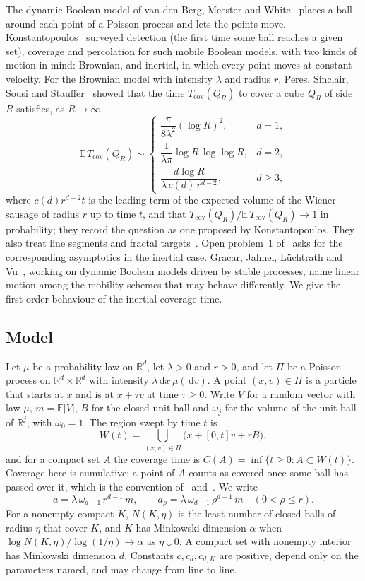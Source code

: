 \documentclass[11pt,a4paper]{article}
\numberwithin{equation}{section}
\theoremstyle{definition}
\theoremstyle{remark}
\newcommand{\E}{\mathbb E}
\newcommand{\R}{\mathbb R}
\newcommand{\dd}{\,\mathrm d}
\newcommand{\abs}[1]{\lvert#1\rvert}
\begin{document}
The dynamic Boolean model of van den Berg, Meester and White~\cite{BMW97}
places a ball around each point of a Poisson process and lets the points move.
Konstantopoulos~\cite{Kon14} surveyed detection (the first time some ball
reaches a given set), coverage and percolation for such mobile Boolean models,
with two kinds of motion in mind: Brownian, and inertial, in which every point
moves at constant velocity. For the Brownian model with intensity $\lambda$
and radius $r$, Peres, Sinclair, Sousi and Stauffer~\cite[Theorem~1.4]{PSSS13}
showed that the time $T_{\mathrm{cov}}(Q_R)$ to cover a cube $Q_R$ of side $R$
satisfies, as $R\to\infty$,
\[
\E\,T_{\mathrm{cov}}(Q_R)\sim
\begin{cases}
\dfrac{\pi}{8\lambda^2}(\log R)^2, & d=1,\\[1.2ex]
\dfrac{1}{\lambda\pi}\log R\,\log\log R, & d=2,\\[1.2ex]
\dfrac{d\log R}{\lambda\,c(d)\,r^{d-2}}, & d\ge3,
\end{cases}
\]
where $c(d)r^{d-2}t$ is the leading term of the expected volume of the Wiener
sausage of radius $r$ up to time $t$, and that
$T_{\mathrm{cov}}(Q_R)/\E\,T_{\mathrm{cov}}(Q_R)\to1$ in probability; they
record the question as one proposed by Konstantopoulos. They also treat line
segments and fractal targets~\cite[Theorem~4.2]{PSSS13}. Open problem~1
of~\cite{Kon14} asks for the
corresponding asymptotics in the inertial case. Gracar, Jahnel, L\"uchtrath and
Vu~\cite{GJLV26}, working on dynamic Boolean models driven by stable
processes, name linear motion among the
mobility schemes that may behave differently. We give the first-order
behaviour of the inertial coverage time.

\subsection{Model}
Let $\mu$ be a probability law on $\R^d$, let $\lambda>0$ and $r>0$, and let
$\Pi$ be a Poisson process on $\R^d\times\R^d$ with intensity
$\lambda\dd x\,\mu(\dd v)$. A point $(x,v)\in\Pi$ is a particle that starts at
$x$ and is at $x+\tau v$ at time $\tau\ge0$. Write $V$ for a random vector with law
$\mu$, $m=\E\abs{V}$, $B$ for the closed unit ball and $\omega_j$ for the
volume of the unit ball of $\R^j$, with $\omega_0=1$. The region swept by
time $t$ is
\[
W(t)=\bigcup_{(x,v)\in\Pi}\bigl(x+[0,t]v+rB\bigr),
\]
and for a compact set $A$ the coverage time is
$C(A)=\inf\{t\ge0:A\subset W(t)\}$. Coverage here is cumulative: a point of
$A$ counts as covered once some ball has passed over it, which is the
convention of~\cite{Kon14} and~\cite{PSSS13}. We write
\[
a=\lambda\,\omega_{d-1}\,r^{d-1}\,m,\qquad
a_\rho=\lambda\,\omega_{d-1}\,\rho^{d-1}\,m\quad(0<\rho\le r).
\]
For a nonempty compact $K$, $N(K,\eta)$ is the least number of closed balls of
radius $\eta$ that cover $K$, and $K$ has Minkowski dimension $\alpha$ when
$\log N(K,\eta)/\log(1/\eta)\to\alpha$ as $\eta\downarrow0$. A compact set with
nonempty interior has Minkowski dimension $d$. Constants $c,c_d,c_{d,K}$ are
positive, depend only on the parameters named, and may change from line to
line.
\end{document}
